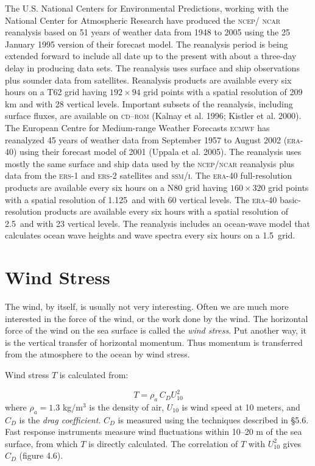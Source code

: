 \begin{enumerate}
\vitem
The U.S. National Centers for Environmental Predictions, working with the
National Center for Atmospheric Research have produced the \textsc{ncep/ ncar} reanalysis
based on 51 years of weather data from 1948 to 2005 using the 25 January 1995
version of their forecast model. The reanalysis period is being extended forward to include all
date up to the present with about a three-day delay in producing data sets. The
reanalysis uses surface and ship observations plus sounder data from satellites.
Reanalysis products are available every six hours on a T62 grid having
$192 \times 94$ grid points with a spatial resolution of 209 km and with 28
vertical levels. Important subsets of the reanalysis, including surface
fluxes, are available on
\textsc{cd--rom} (Kalnay et al. 1996; Kistler et al. 2000).
\vitem
The European Centre for Medium-range Weather Forecasts \textsc{ecmwf} has
reanalyzed 45 years of weather data from September 1957 to August 2002 (\textsc{era}-40) using their forecast model of 2001 (Uppala et al. 2005). The reanalysis uses mostly the same surface and ship data used by the \textsc{ncep/ncar}
reanalysis plus data from the \textsc{ers}-1 and \textsc{ers}-2 satellites and
\textsc{ssm/i}. The \textsc{era}-40 full-resolution products are available every six hours on a N80 grid having
$160 \times 320$ grid points with a spatial resolution of 1.125\degrees\ and with 60
vertical levels. The  \textsc{era}-40 basic-resolution products are available every six hours with a spatial resolution of 2.5\degrees\ and with 23 vertical levels. The reanalysis includes an ocean-wave model that calculates ocean wave heights and wave spectra every six hours on a 1.5\degrees\ grid.
\end{enumerate}

\section{Wind Stress}
The wind, by itself, is usually not very interesting. Often we are
much more interested in the force of the wind, or the work done by the wind. The horizontal
force of the wind on the sea surface is called the \textit{wind stress}. Put another way, it
is the vertical transfer of horizontal momentum. Thus momentum is transferred from the
atmosphere to the ocean by wind stress.

Wind stress $T$ is calculated from:

\begin{equation}
T = \rho_a \,C_D U_{10}^2
\end{equation}
where $\rho_a = 1.3$ kg/m$^3$ is the density of air, $U_{10}$ is wind speed at 10
meters, and $C_D$ is the \textit{drag coefficient}.
$C_D$ is measured using the techniques described in \S5.6. Fast response
instruments measure wind fluctuations within 10--20 m of the sea surface, from
which $T$ is directly calculated. The correlation of $T$ with $U_{10}^2$ gives
$C_D$ (figure 4.6).


